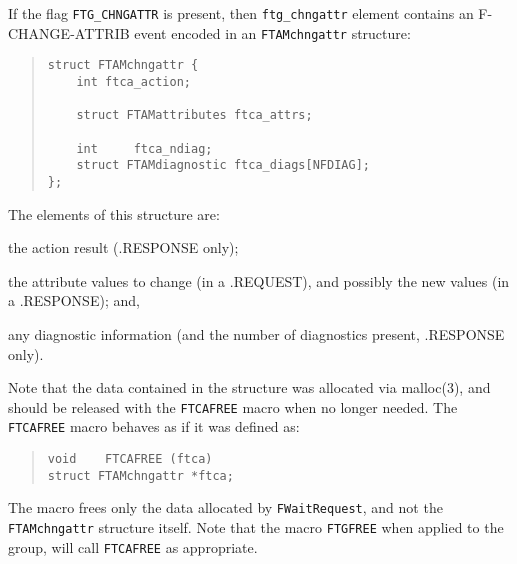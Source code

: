 If the flag \verb"FTG_CHNGATTR" is present,
then \verb"ftg_chngattr" element contains an {\sf F-CHANGE-ATTRIB\/} event encoded in
an \verb"FTAMchngattr" structure:
\begin{quote}\small\begin{verbatim}
struct FTAMchngattr {
    int ftca_action;

    struct FTAMattributes ftca_attrs;

    int     ftca_ndiag;
    struct FTAMdiagnostic ftca_diags[NFDIAG];
};
\end{verbatim}\end{quote}
The elements of this structure are:
\begin{describe}
\item[\verb"ftca\_action":] the action result ({\sf .RESPONSE\/} only);

\item[\verb"ftca\_attrs":] the attribute values to change
(in a {\sf .REQUEST\/}),
and possibly the new values (in a {\sf .RESPONSE\/});
and,

\item[\verb"ftca\_diags"/\verb"ftca\_ndiag":] any diagnostic information
(and the number of diagnostics present, {\sf .RESPONSE\/} only).
\end{describe}
Note that the data contained in the structure was allocated via \man malloc(3),
and should be released with the \verb"FTCAFREE" macro when no longer needed.
The \verb"FTCAFREE" macro
behaves as if it was defined as:
\begin{quote}\small\begin{verbatim}
void    FTCAFREE (ftca)
struct FTAMchngattr *ftca;
\end{verbatim}\end{quote}
The macro frees only the data allocated by \verb"FWaitRequest",
and not the \verb"FTAMchngattr" structure itself.
Note that the macro \verb"FTGFREE" when applied to the group,
will call \verb"FTCAFREE" as appropriate.

